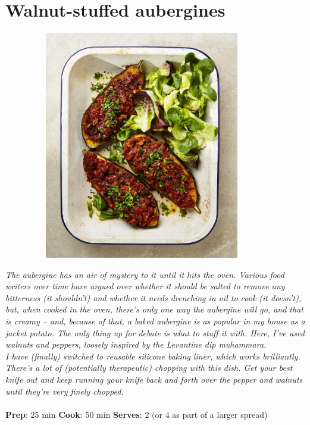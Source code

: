 \documentclass{book}
\begin{document}
\section{Walnut-stuffed aubergines}
\begin{figure}
\centering\includegraphics[width=10cm,height=10cm,keepaspectratio]{Recipe_Pictures/Walnut-stuffed_aubergines.png}
\end{figure}
\emph{The aubergine has an air of mystery to it until it hits the oven. Various food writers over time have argued over whether it should be salted to remove any bitterness (it shouldn’t) and whether it needs drenching in oil to cook (it doesn’t), but, when cooked in the oven, there’s only one way the aubergine will go, and that is creamy – and, because of that, a baked aubergine is as popular in my house as a jacket potato. The only thing up for debate is what to stuff it with. Here, I’ve used walnuts and peppers, loosely inspired by the Levantine dip muhammara.\\ 
I have (finally) switched to reusable silicone baking liner, which works brilliantly. There’s a lot of (potentially therapeutic) chopping with this dish. Get your best knife out and keep running your knife back and forth over the pepper and walnuts until they’re very finely chopped.}\\\\ 
\textbf{Prep}: 25 min
\textbf{Cook}: 50 min
\textbf{Serves}: 2 (or 4 as part of a larger spread)
\end{document}
